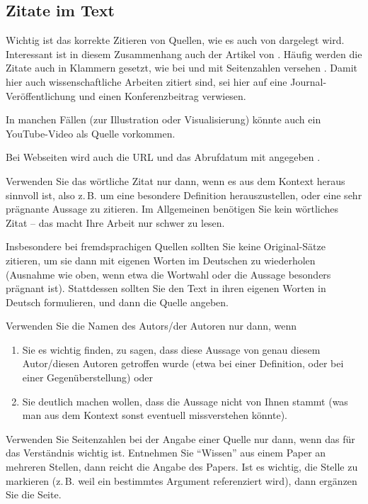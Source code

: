 \documentclass[conference,compsoc,final,a4paper]{IEEEtran}
\begin{document}
    \subsection{Zitate im Text}
    Wichtig ist das korrekte Zitieren von Quellen, wie es auch von \cite{Kornmeier2011} dargelegt wird. Interessant ist in diesem Zusammenhang auch der Artikel von \cite{Kramer2009}. Häufig werden die Zitate auch in Klammern gesetzt, wie bei \parencite{Kornmeier2011} und mit Seitenzahlen versehen \parencite[S. 22--24]{Kornmeier2011}.
    Damit hier auch wissenschaftliche Arbeiten zitiert sind, sei hier auf eine Journal-Veröffentlichung \cite{Christidis2016} und einen Konferenzbeitrag \cite{Redmon2016} verwiesen.

    In manchen Fällen (zur Illustration oder Visualisierung) könnte auch ein YouTube-Video\autocite{gronkh2019} als Quelle vorkommen.

    Bei Webseiten wird auch die URL und das Abrufdatum mit angegeben \parencite{Gao2017}.

    Verwenden Sie das wörtliche Zitat nur dann, wenn es aus dem Kontext heraus sinnvoll ist, also z.\,B. um eine besondere Definition herauszustellen, oder eine sehr prägnante Aussage zu zitieren. Im Allgemeinen benötigen Sie kein wörtliches Zitat -- das macht Ihre Arbeit nur schwer zu lesen.

    Insbesondere bei fremdsprachigen Quellen sollten Sie keine Original-Sätze zitieren, um sie dann mit eigenen Worten im Deutschen zu wiederholen (Ausnahme wie oben, wenn etwa die Wortwahl oder die Aussage besonders prägnant ist). Stattdessen sollten Sie den Text in ihren eigenen Worten in Deutsch formulieren, und dann die Quelle angeben.

    Verwenden Sie die Namen des Autors/der Autoren nur dann, wenn

    \begin{enumerate}
        \item Sie es wichtig finden, zu sagen, dass diese Aussage von genau diesem Autor/diesen Autoren getroffen wurde (etwa bei einer Definition, oder bei einer Gegenüberstellung) oder
        \item Sie deutlich machen wollen, dass die Aussage nicht von Ihnen stammt (was man aus dem Kontext sonst eventuell missverstehen könnte).
    \end{enumerate}

    Verwenden Sie Seitenzahlen bei der Angabe einer Quelle nur dann, wenn das für das Verständnis wichtig ist. Entnehmen Sie \enquote{Wissen} aus einem Paper an mehreren Stellen, dann reicht die Angabe des Papers. Ist es wichtig, die Stelle zu markieren (z.\,B. weil ein bestimmtes Argument referenziert wird), dann ergänzen Sie die Seite.
\end{document}
